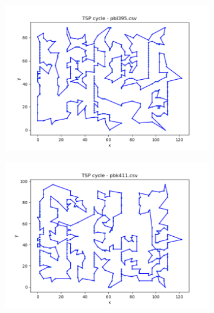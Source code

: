 \documentclass[12pt]{article}
\begin{document}
\begin{figure}[htpb]
\begin{subfigure}[b]{0.475\textwidth}
            \end{subfigure}
            \hfill
            \begin{subfigure}[b]{0.475\textwidth}
                \includegraphics[width=\linewidth]{img/pbl395.png}
            \end{subfigure}
            \begin{subfigure}[b]{0.475\textwidth}
                \includegraphics[width=\linewidth]{img/pbk411.png}
            \end{subfigure}
            \hfill
            \begin{subfigure}[b]{0.475\textwidth}

\end{subfigure}
\end{figure}
\end{document}
